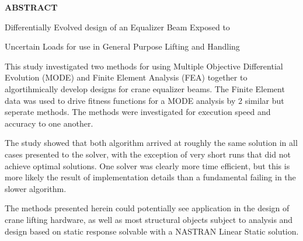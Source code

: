 {\LARGE\center
  \textbf{\uppercase{Abstract}}\par
}

{\Large{ {\centerline{Differentially Evolved design of an Equalizer Beam Exposed to}}}}
{\Large{ {\centerline{Uncertain Loads for use in General Purpose Lifting and Handling}}}}

\vspace{1cm}

This study investigated two methods for using Multiple Objective Differential Evolution (MODE) and Finite Element Analysis (FEA) together to algortihmically develop designs for crane equalizer beams. The Finite Element data was used to drive fitness functions for a MODE analysis by 2 similar but seperate methods. The methods were investigated for execution speed and accuracy to one another. 

The study showed that both algorithm arrived at roughly the same solution in all cases presented to the solver, with the exception of very short runs that did not achieve optimal solutions. One solver was clearly more time efficient, but this is more likely the result of implementation details than a fundamental failing in the slower algorithm. 

The methods presented herein could potentially see application in the design of crane lifting hardware, as well as most structural objects subject to analysis and design based on static response solvable with a NASTRAN Linear Static solution. 
